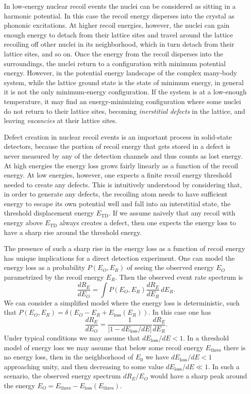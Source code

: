 \documentclass[b5paper, 10pt, twoside]{book}
\newcommand{\der}[2]{\frac{d#1}{d#2}}
\newcommand{\difd}{\,d}
\begin{document}
In low-energy nuclear recoil events the nuclei can be considered as sitting in a harmonic potential. In this case the recoil energy disperses into the crystal as phononic excitations. At higher recoil energies, however, the nuclei can gain enough energy to detach from their lattice sites and travel around the lattice recoiling off other nuclei in its neighborhood, which in turn detach from their lattice sites, and so on. Once the energy from the recoil disperses into the surroundings, the nuclei return to a configuration with minimum potential energy. However, in the potential energy landscape of the complex many-body system, while the lattice ground state is the state of minimum energy, in general it is not the only minimum-energy configuration. If the system is at a low-enough temperature, it may find an energy-minimizing configuration where some nuclei do not return to their lattice sites, becoming \emph{inerstitial defects} in the lattice, and leaving \emph{vacancies} at their lattice sites.

Defect creation in nuclear recoil events is an important process in solid-state detectors, because the portion of recoil energy that gets stored in a defect is never measured by any of the detection channels and thus counts as lost energy. At high energies the energy loss grows fairly linearly as a function of the recoil energy. At low energies, however, one expects a finite recoil energy threshold needed to create any defects. This is intuitively understood  by considering that, in order to generate any defects, the recoiling atom needs to have sufficient energy to escape its own potential well and fall into an interstitial state, the threshold displacement energy  $E_\text{TD}$. If we assume naively that any recoil with energy above $E_\text{TD}$ always creates a defect, then one expects the energy loss to have a sharp rise around the threshold energy.

The presence of such a sharp rise in the energy loss as a function of recoil energy has unique implications for a direct detection experiment. One can model the energy loss as a probability $P(E_O,E_R)$ of seeing the observed energy $E_O$ parametrized by the recoil energy $E_R$. Then the observed event rate spectrum is
\begin{equation}
    \der{R_E}{E_O}=\int P(E_O,E_R)\der{R_E}{E_R}\difd E_R.
    \label{eq:eloss-convolution}
\end{equation}
We can consider a simplified model where the energy loss is deterministic, such that $P(E_O,E_R)=\delta(E_O-E_R+E_\text{loss}(E_R))$. In this case one has
\begin{equation}
    \der{R_E}{E_O}=\frac{1}{|1-dE_\text{loss}/dE|}\der{R_E}{E_R}.
\end{equation}
Under typical conditions we may assume that $dE_\text{loss}/dE<1$. In a threshold model of energy loss we may assume that below some recoil energy $E_\text{thres}$ there is no energy loss, then in the neighborhood of $E_0$ we have $dE_\text{loss}/dE<1$ approaching unity, and then decreasing to some value $dE_\text{loss}/dE\ll1$. In such a scenario, the observed energy spectrum $dR_E/E_O$ would have a sharp peak around the energy $E_O=E_\text{thres}-E_\text{loss}(E_\text{thres})$.
\end{document}
